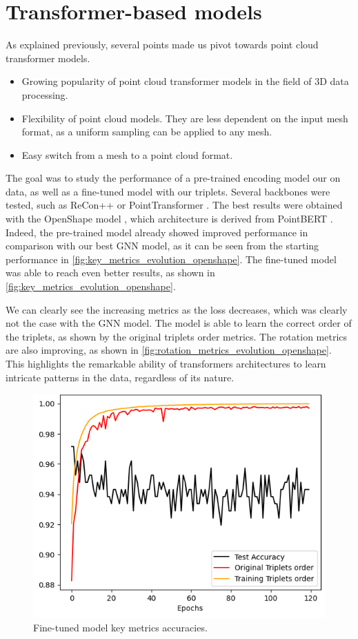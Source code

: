 \section{Transformer-based models}
\label{sec:transformer-based-models}

As explained previously, several points made us pivot towards point cloud transformer models.
\begin{itemize}
    \item Growing popularity of point cloud transformer models in the field of 3D data processing.
    \item Flexibility of point cloud models. They are less dependent on the input mesh format, as a uniform sampling can be applied to any mesh.
    \item Easy switch from a mesh to a point cloud format.
\end{itemize}

The goal was to study the performance of a pre-trained encoding model our on data, as well as a fine-tuned model with our triplets. Several backbones were tested, such as ReCon++ \cite{qiShapeLLMUniversal3D2024} or PointTransformer \cite{zhaoPointTransformer2021}. The best results were obtained with the OpenShape model \cite{liuOpenShapeScaling3D2023}, which architecture is derived from PointBERT \cite{yuPointBERTPretraining3D2022}. Indeed, the pre-trained model already showed improved performance in comparison with our best GNN model, as it can be seen from the starting performance in \autoref{fig:key_metrics_evolution_openshape}. The fine-tuned model was able to reach even better results, as shown in \autoref{fig:key_metrics_evolution_openshape}.

We can clearly see the increasing metrics as the loss decreases, which was clearly not the case with the GNN model. The model is able to learn the correct order of the triplets, as shown by the original triplets order metrics. The rotation metrics are also improving, as shown in \autoref{fig:rotation_metrics_evolution_openshape}.
This highlights the remarkable ability of transformers architectures to learn intricate patterns in the data, regardless of its nature.

\begin{figure}[h]
    \centering
    \includegraphics[width=0.5\columnwidth]{images/key_metrics_evolution_openshape.png}
    \caption{Fine-tuned model key metrics accuracies.}
    \label{fig:key_metrics_evolution_openshape}
\end{figure}

